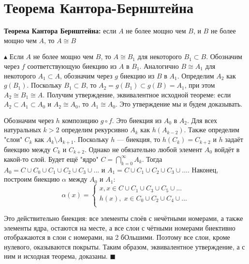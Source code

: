 \setcounter{section}{15}

\section{Теорема Кантора-Бернштейна}

\par \textbf{Теорема Кантора Бернштейна: } если $A$ не более мощно чем $B$, и $B$ не более мощно чем $A$, то $A \cong B$
\par $\blacktriangle$ Если $A$ не более мощно чем $B$, то $A \cong B_1$ для некоторого $B_1 \subset B$. Обозначим через $f$ соответствующую биекцию из $A$ в $B_1$. Аналогично $B \cong A_1$ для некоторого $A_1 \subset A$, обозначим через $g$ биекцию из $B$ в $A_1$. Определим $A_2$ как $g(B_1)$. Поскольку $B_1 \subset B$, то $A_2 = g(B_1) \subset g(B) = A_1$, при этом $A_2 \cong B_1 \cong A$. Получим утверждение, эквивалентное исходной теореме: если $A_2 \subset A_1 \subset A_0$ и $A_2 \cong A_0$, то $A_1 \cong A_0$. Это утверждение мы и будем доказывать.
\par Обозначим через $h$ композицию $g \circ f$. Это биекция из $A_0$ в $A_2$. Для всех натуральных $k > 2$ определим рекурсивно $A_k$ как $h(A_{k-2})$. Также определим "слои"  $C_k$ как $A_k \setminus
A_{k+1}$. Поскольку $h$ — биекция, то $h(C_k) = C_{k+2}$ и $h$ задаёт биекцию между $C_k$ и $C_{k+2}$.
Однако не обязательно любой элемент $A_0$ войдёт в какой-то слой. Будет ещё "ядро" $C = \bigcap_{k=0}^{\infty} A_k$. Тогда $A_0 = C \cup C_0 \cup C_1 \cup C_2 \cup C_3 \cup . . .$ и $A_1 = C \cup C_1 \cup C_2 \cup C_3 \cup . . . $. Наконец,
построим биекцию $\alpha$ между $A_0$ и $A_1$:
$$\alpha(x)=\left\{
\begin{array}{ccc}
x, x \in C \cup C_1 \cup C_3 \cup C_5 \cup ...\\
h(x), \; x \in C_0 \cup C_2 \cup C_4 \cup ...\\
\end{array}
\right. $$
\par Это действительно биекция: все элементы слоёв с нечётными номерами, а также элементы ядра, остаются на месте, а все слои с чётными номерами биективно отображаются
в слои с номерами, на 2 бОльшими. Поэтому все слои, кроме нулевого, оказываются
покрыты. Таким образом, эквивалентное утверждение, а с ним и исходная теорема,
доказаны. $\blacksquare$

\begin{figure}[h]
\end{figure}